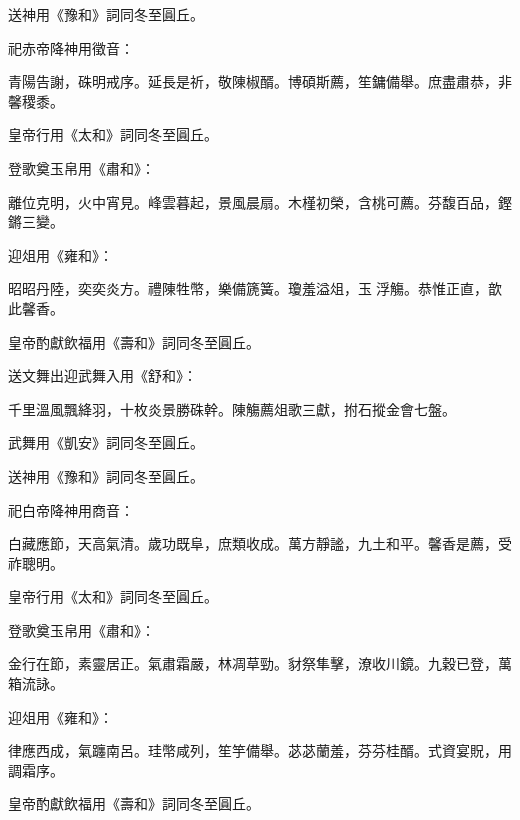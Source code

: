\begin{pinyinscope}
 送神用《豫和》詞同冬至圓丘。



 祀赤帝降神用徵音：



 青陽告謝，硃明戒序。延長是祈，敬陳椒醑。博碩斯薦，笙鏞備舉。庶盡肅恭，非馨稷黍。



 皇帝行用《太和》詞同冬至圓丘。



 登歌奠玉帛用《肅和》：



 離位克明，火中宵見。峰雲暮起，景風晨扇。木槿初榮，含桃可薦。芬馥百品，鏗鏘三變。



 迎俎用《雍和》：



 昭昭丹陸，奕奕炎方。禮陳牲幣，樂備篪簧。瓊羞溢俎，玉浮觴。恭惟正直，歆此馨香。



 皇帝酌獻飲福用《壽和》詞同冬至圓丘。



 送文舞出迎武舞入用《舒和》：



 千里溫風飄絳羽，十枚炎景勝硃幹。陳觴薦俎歌三獻，拊石摐金會七盤。



 武舞用《凱安》詞同冬至圓丘。



 送神用《豫和》詞同冬至圓丘。



 祀白帝降神用商音：



 白藏應節，天高氣清。歲功既阜，庶類收成。萬方靜謐，九土和平。馨香是薦，受祚聰明。



 皇帝行用《太和》詞同冬至圓丘。



 登歌奠玉帛用《肅和》：



 金行在節，素靈居正。氣肅霜嚴，林凋草勁。豺祭隼擊，潦收川鏡。九穀已登，萬箱流詠。



 迎俎用《雍和》：



 律應西成，氣躔南呂。珪幣咸列，笙竽備舉。苾苾蘭羞，芬芬桂醑。式資宴貺，用調霜序。



 皇帝酌獻飲福用《壽和》詞同冬至圓丘。




\end{pinyinscope}
